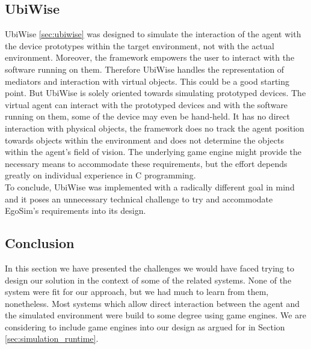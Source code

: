\subsection{UbiWise}\label{subsec:design_ubiwise}
UbiWise \ref{sec:ubiwise} was designed to simulate the interaction of the agent with the device prototypes within the target environment, not with the actual environment. Moreover, the framework empowers the user to interact with the software running on them. Therefore UbiWise handles the representation of mediators and interaction with virtual objects. This could be a good starting point. But UbiWise is solely oriented towards simulating prototyped devices. The virtual agent can interact with the prototyped devices and with the software running on them, some of the device may even be hand-held. It has no direct interaction with physical objects, the framework does no track the agent position towards objects within the environment and does not determine the objects within the agent's field of vision. The underlying game engine might provide the necessary means to accommodate these requirements, but the effort depends greatly on individual experience in C programming.\\

To conclude, UbiWise was implemented with a radically different goal in mind and it poses an unnecessary technical challenge to try and accommodate EgoSim's requirements into its design.\\

\subsection{Conclusion}\label{subsec:reusing_conclusion}
In this section we have presented the challenges we would have faced trying to design our solution in the context of some of the related systems. None of the system were fit for our approach, but we had much to learn from them, nonetheless. Most systems which allow direct interaction between the agent and the simulated environment were build to some degree using game engines. We are considering to include game engines into our design as argued for in Section \ref{sec:simulation_runtime}.

